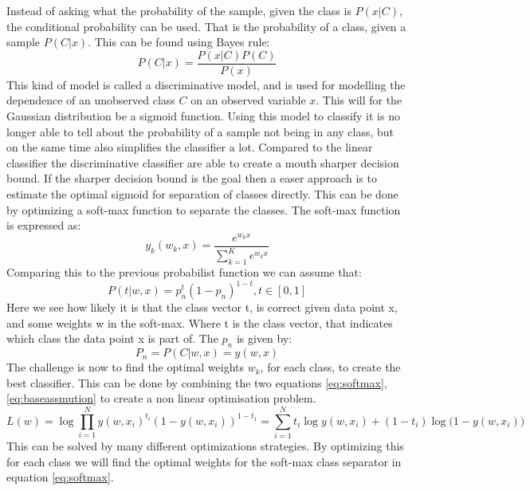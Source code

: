 Instead of asking what the probability of the sample, given the class is $P(x|C)$, the conditional probability can be used. That is the probability of a class, given a sample $P(C|x)$. This can be found using Bayes rule:
\begin{equation}
 P(C|x)=\frac{P(x|C)P(C)}{P(x)}
\end{equation}
This kind of model is called a discriminative model, and is used for modelling the dependence of an unobserved class $C$ on an observed variable $x$. This will for the Gaussian distribution be a sigmoid function. Using this model to classify it is no longer able to tell about the probability of a sample not being in any class, but on the same time also simplifies the classifier a lot. Compared to the linear classifier the discriminative classifier are able to create a mouth sharper decision bound. If the sharper decision bound is the goal then a easer approach is to estimate the optimal sigmoid for separation of classes directly. This can be done by optimizing a soft-max function to separate the classes. The soft-max function is expressed as: 
\begin{equation}
\label{eq:softmax}
 y_k(w_k,x)=\frac{e^{w_k x}}{\sum\limits_{k=1}^K e^{w_k x}}
\end{equation}
Comparing this to the previous probabilist function we can assume that:
\begin{equation}
\label{eq:baseassmution}
 P(t|w,x) = p_n^t (1-p_n)^{1-t} , t \in [0,1] 
\end{equation}
Here we see how likely it is that the class vector t, is correct given data point x, and some weights w in the soft-max.  Where t is the class vector, that indicates which class the data point x is part of.  The $p_n$ is given by: 
\begin{equation}
 P_n = P(C| w, x) = y(w,x)
\end{equation}
The challenge is now to find the optimal weights $w_k$, for each class, to create the best classifier. This can be done by combining the two equations \ref{eq:softmax}, \ref{eq:baseassmution} to create a non linear optimisation problem.
\begin{equation}
 L(w) = \log{\prod\limits_{i=1}^N y(w,x_i)^{t_i} ( 1-y(w,x_i))^{1-t_1}}
 = \sum\limits_{i=1}^N t_i\log{y(w,x_i)}+(1-t_i)\log({1-y(w,x_i))}
\end{equation}
This can be solved by many different optimizations strategies. By optimizing this for each class we will find the optimal weights for the soft-max class separator in equation \ref{eq:softmax}.\\

